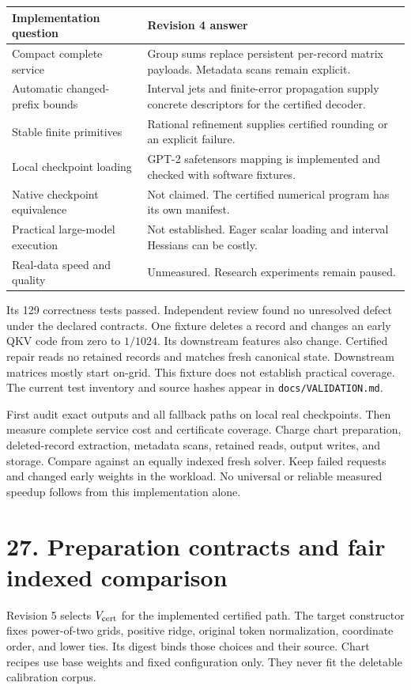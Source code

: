 \begin{tabularx}{\linewidth}{@{}p{.31\linewidth}X@{}}\toprule
Implementation question & Revision 4 answer\\\midrule
Compact complete service & Group sums replace persistent per-record matrix payloads. Metadata scans remain explicit.\\
Automatic changed-prefix bounds & Interval jets and finite-error propagation supply concrete descriptors for the certified decoder.\\
Stable finite primitives & Rational refinement supplies certified rounding or an explicit failure.\\
Local checkpoint loading & GPT-2 safetensors mapping is implemented and checked with software fixtures.\\
Native checkpoint equivalence & Not claimed. The certified numerical program has its own manifest.\\
Practical large-model execution & Not established. Eager scalar loading and interval Hessians can be costly.\\
Real-data speed and quality & Unmeasured. Research experiments remain paused.\\\bottomrule
\end{tabularx}

 Its 129 correctness tests passed. Independent review found no unresolved defect under the declared contracts. One fixture deletes a record and changes an early QKV code from zero to $1/1024$. Its downstream features also change. Certified repair reads no retained records and matches fresh canonical state. Downstream matrices mostly start on-grid. This fixture does not establish practical coverage. The current test inventory and source hashes appear in \texttt{docs/VALIDATION.md}.

 First audit exact outputs and all fallback paths on local real checkpoints. Then measure complete service cost and certificate coverage. Charge chart preparation, deleted-record extraction, metadata scans, retained reads, output writes, and storage. Compare against an equally indexed fresh solver. Keep failed requests and changed early weights in the workload. No universal or reliable measured speedup follows from this implementation alone.

\newpage
\section*{27. Preparation contracts and fair indexed comparison}
Revision 5 selects $V_{\rm cert}$ for the implemented certified path. The target constructor fixes power-of-two grids, positive ridge, original token normalization, coordinate order, and lower ties. Its digest binds those choices and their source. Chart recipes use base weights and fixed configuration only. They never fit the deletable calibration corpus.

